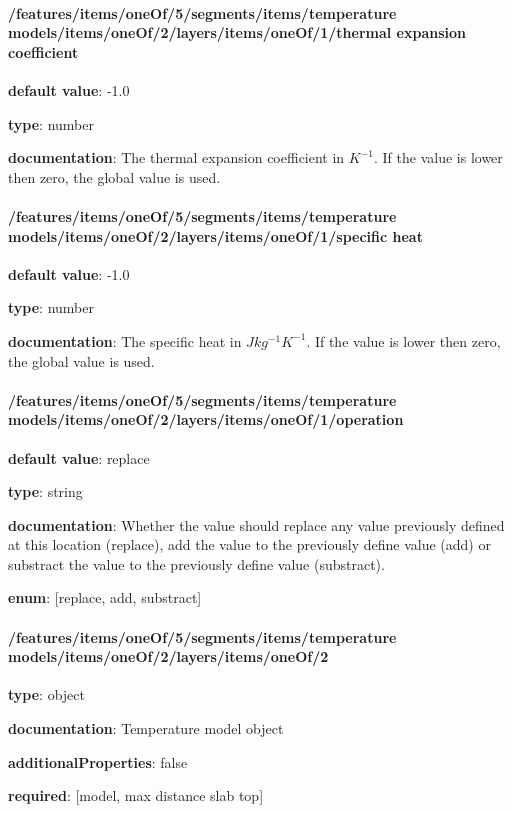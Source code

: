 \begin{itemized}
\end{itemized}\paragraph{/features/items/oneOf/5/segments/items/temperature models/items/oneOf/2/layers/items/oneOf/1/thermal expansion coefficient} \begin{itemized}
\item {\bf default value}: -1.0
\item {\bf type}: number
\item {\bf documentation}: The thermal expansion coefficient in $K^{-1}$. If the value is lower then zero, the global value is used.
\end{itemized}\paragraph{/features/items/oneOf/5/segments/items/temperature models/items/oneOf/2/layers/items/oneOf/1/specific heat} \begin{itemized}
\item {\bf default value}: -1.0
\item {\bf type}: number
\item {\bf documentation}: The specific heat in $J kg^{-1} K^{-1}$. If the value is lower then zero, the global value is used.
\end{itemized}\paragraph{/features/items/oneOf/5/segments/items/temperature models/items/oneOf/2/layers/items/oneOf/1/operation} \begin{itemized}
\item {\bf default value}: replace
\item {\bf type}: string
\item {\bf documentation}: Whether the value should replace any value previously defined at this location (replace), add the value to the previously define value (add) or substract the value to the previously define value (substract).
\item {\bf enum}: [replace, add, substract]\end{itemized}\paragraph{/features/items/oneOf/5/segments/items/temperature models/items/oneOf/2/layers/items/oneOf/2} \begin{itemized}
\item {\bf type}: object
\item {\bf documentation}: Temperature model object
\item {\bf additionalProperties}: false
\item {\bf required}: [model, max distance slab top]\end{itemized}
